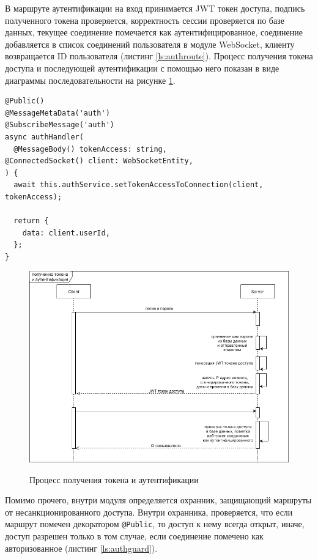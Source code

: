 В маршруте аутентификации на вход принимается JWT токен доступа, подпись полученного токена проверяется, корректность сессии проверяется по базе данных, текущее соединение помечается как аутентифицированное, соединение добавляется в список соединений пользователя в модуле WebSocket, клиенту возвращается ID пользователя (листинг \ref{ls:authroute}). Процесс получения токена доступа и последующей аутентификации с помощью него показан в виде диаграммы последовательности на рисунке \ref{fig:auth}.

\begin{lstlisting}[caption={Определение маршрута аутентификации}, label={ls:authroute}]
@Public()
@MessageMetaData('auth')
@SubscribeMessage('auth')
async authHandler(
  @MessageBody() tokenAccess: string,
@ConnectedSocket() client: WebSocketEntity,
) {
  await this.authService.setTokenAccessToConnection(client, tokenAccess);

  return {
    data: client.userId,
  };
}
\end{lstlisting}

\begin{figure}[H]
\begin{center}
\includegraphics[width=1.0\hsize]{fig/auth.png}\\[2mm]
\caption{Процесс получения токена и аутентификации}\label{fig:auth}
\end{center}
\end{figure}

Помимо прочего, внутри модуля определяется охранник, защищающий маршруты от несанкционированного доступа. Внутри охранника, проверяется, что если маршрут помечен декоратором \verb|@Public|, то доступ к нему всегда открыт, иначе, доступ разрешен только в том случае, если соединение помечено как авторизованное (листинг \ref{ls:authguard}).

